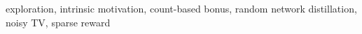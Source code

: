 exploration, intrinsic motivation, count-based bonus, random network distillation, noisy TV, sparse reward
